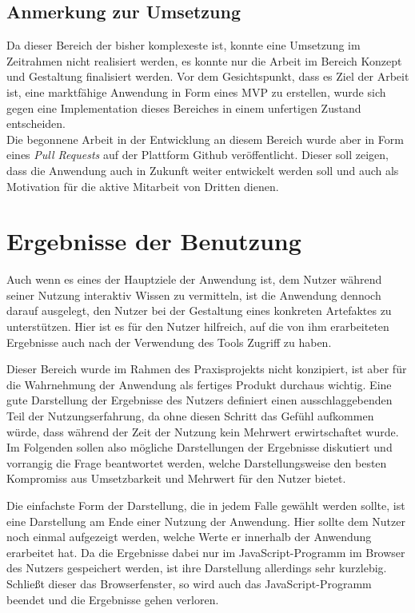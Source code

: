 \subsection{Anmerkung zur Umsetzung}
\label{chap:grid_dev}
Da dieser Bereich der bisher komplexeste ist, konnte eine Umsetzung im Zeitrahmen nicht realisiert werden, es konnte nur die Arbeit im Bereich Konzept und Gestaltung finalisiert werden.
 Vor dem Gesichtspunkt, dass es Ziel der Arbeit ist, eine marktfähige Anwendung in Form eines MVP zu erstellen, wurde sich gegen eine Implementation dieses Bereiches in einem unfertigen Zustand entscheiden.\\
Die begonnene Arbeit in der Entwicklung an diesem Bereich wurde aber in Form eines \textit{Pull Requests} auf der Plattform Github veröffentlicht. Dieser soll zeigen, dass die Anwendung auch in Zukunft weiter entwickelt werden soll und auch als Motivation für die aktive Mitarbeit von Dritten dienen.

\section{Ergebnisse der Benutzung}
\label{chap:results}
Auch wenn es eines der Hauptziele der Anwendung ist, dem Nutzer während seiner Nutzung interaktiv Wissen zu vermitteln, ist die Anwendung dennoch darauf ausgelegt, den Nutzer bei der Gestaltung eines konkreten Artefaktes zu unterstützen. Hier ist es für den Nutzer hilfreich, auf die von ihm erarbeiteten Ergebnisse auch nach der Verwendung des Tools Zugriff zu haben.

Dieser Bereich wurde im Rahmen des Praxisprojekts nicht konzipiert, ist aber für die Wahrnehmung der Anwendung als fertiges Produkt durchaus wichtig. Eine gute Darstellung der Ergebnisse des Nutzers definiert einen ausschlaggebenden Teil der Nutzungserfahrung, da ohne diesen Schritt das Gefühl aufkommen würde, dass während der Zeit der Nutzung kein Mehrwert erwirtschaftet wurde.
Im Folgenden sollen also mögliche Darstellungen der Ergebnisse diskutiert und vorrangig die Frage beantwortet werden, welche Darstellungsweise den besten Kompromiss aus Umsetzbarkeit und Mehrwert für den Nutzer bietet.

Die einfachste Form der Darstellung, die in jedem Falle gewählt werden sollte, ist eine Darstellung am Ende einer Nutzung der Anwendung. Hier sollte dem Nutzer noch einmal aufgezeigt werden, welche Werte er innerhalb der Anwendung erarbeitet hat. Da die Ergebnisse dabei nur im JavaScript-Programm im Browser des Nutzers gespeichert werden, ist ihre Darstellung allerdings sehr kurzlebig. Schließt dieser das Browserfenster, so wird auch das JavaScript-Programm beendet und die Ergebnisse gehen verloren.

